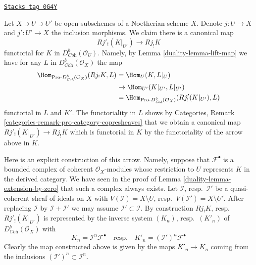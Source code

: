 \begin{remark}
\label{duality-remark-covariance-open-j-lower-shriek}
\href{https://stacks.math.columbia.edu/tag/0G4Y}{\texttt{Stacks tag 0G4Y}}

Let $X \supset U \supset U'$ be open subschemes of a Noetherian scheme $X$.
Denote $j : U \to X$ and $j' : U' \to X$ the inclusion morphisms.
We claim there is a canonical map
$$
Rj'_!(K|_{U'}) \longrightarrow Rj_!K
$$
functorial for $K$ in $D^b_{\textit{Coh}}(\mathcal{O}_U)$. Namely, by
Lemma \ref{duality-lemma-lift-map} we have for any $L$ in
$D^b_{\textit{Coh}}(\mathcal{O}_X)$ the map
\begin{align*}
\Hom_{\text{Pro-}D^b_{\textit{Coh}}(\mathcal{O}_X)}(Rj_!K, L)
& =
\Hom_U(K, L|_U) \\
& \to
\Hom_{U'}(K|_{U'}, L|_{U'}) \\
& =
\Hom_{\text{Pro-}D^b_{\textit{Coh}}(\mathcal{O}_X)}(Rj'_!(K|_{U'}), L)
\end{align*}
functorial in $L$ and $K'$. The functoriality in $L$ shows by
Categories, Remark \ref{categories-remark-pro-category-copresheaves}
that we obtain a canonical map $Rj'_!(K|_{U'}) \to Rj_!K$ which is
functorial in $K$ by the functoriality of the arrow above in $K$.

\medskip\noindent
Here is an explicit construction of this arrow. Namely, suppose
that $\mathcal{F}^\bullet$ is a bounded complex of coherent
$\mathcal{O}_X$-modules whose restriction to $U$ represents $K$
in the derived category. We have seen in the proof of
Lemma \ref{duality-lemma-extension-by-zero}
that such a complex always exists. Let $\mathcal{I}$, resp.\ $\mathcal{I}'$
be a quasi-coherent sheaf of ideals on $X$ with
$V(\mathcal{I}) = X \setminus U$, resp.\ $V(\mathcal{I}') = X \setminus U'$.
After replacing $\mathcal{I}$ by $\mathcal{I} + \mathcal{I}'$
we may assume $\mathcal{I}' \subset \mathcal{I}$.
By construction $Rj_!K$, resp.\ $Rj'_!(K|_{U'})$ is represented by the
inverse system $(K_n)$, resp.\ $(K'_n)$ of $D^b_{\textit{Coh}}(\mathcal{O}_X)$
with
$$
K_n = \mathcal{I}^n\mathcal{F}^\bullet
\quad\text{resp.}\quad
K'_n = (\mathcal{I}')^n\mathcal{F}^\bullet
$$
Clearly the map constructed above is given by the maps
$K'_n \to K_n$ coming from the inclusions
$(\mathcal{I}')^n \subset \mathcal{I}^n$.
\end{remark}

